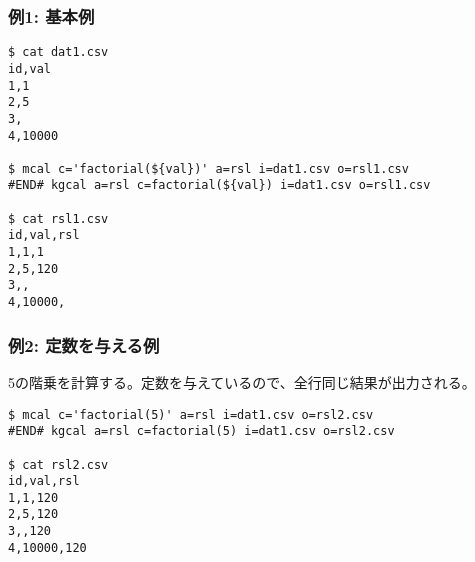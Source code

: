 
\subsubsection*{例1: 基本例}


\begin{Verbatim}[baselinestretch=0.7,frame=single]
$ cat dat1.csv
id,val
1,1
2,5
3,
4,10000

$ mcal c='factorial(${val})' a=rsl i=dat1.csv o=rsl1.csv
#END# kgcal a=rsl c=factorial(${val}) i=dat1.csv o=rsl1.csv

$ cat rsl1.csv
id,val,rsl
1,1,1
2,5,120
3,,
4,10000,
\end{Verbatim}

\subsubsection*{例2: 定数を与える例}

5の階乗を計算する。定数を与えているので、全行同じ結果が出力される。

\begin{Verbatim}[baselinestretch=0.7,frame=single]
$ mcal c='factorial(5)' a=rsl i=dat1.csv o=rsl2.csv
#END# kgcal a=rsl c=factorial(5) i=dat1.csv o=rsl2.csv

$ cat rsl2.csv
id,val,rsl
1,1,120
2,5,120
3,,120
4,10000,120
\end{Verbatim}

